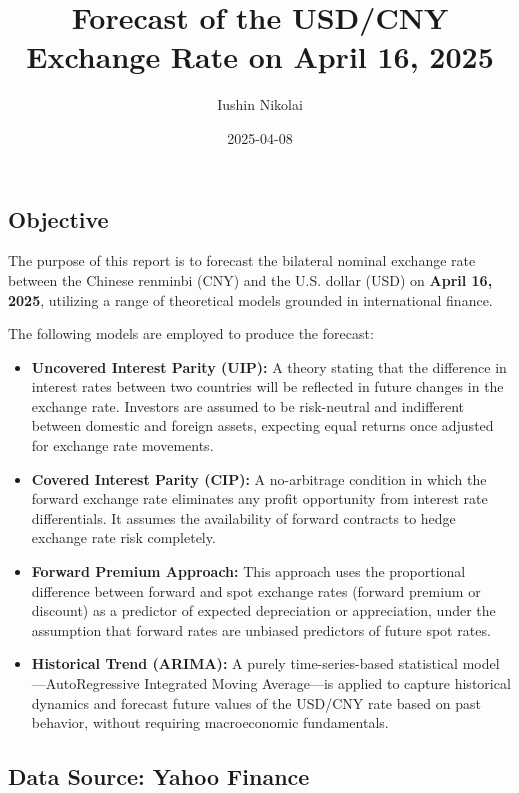 \documentclass[
]{article}
\title{Forecast of the USD/CNY Exchange Rate on April 16, 2025}
\author{Iushin Nikolai}
\date{2025-04-08}
\begin{document}
\maketitle

{
\setcounter{tocdepth}{2}
\tableofcontents
}
\subsection{Objective}\label{objective}

The purpose of this report is to forecast the bilateral nominal exchange
rate between the Chinese renminbi (CNY) and the U.S. dollar (USD) on
\textbf{April 16, 2025}, utilizing a range of theoretical models
grounded in international finance.

The following models are employed to produce the forecast:

\begin{itemize}
\item
  \textbf{Uncovered Interest Parity (UIP):} A theory stating that the
  difference in interest rates between two countries will be reflected
  in future changes in the exchange rate. Investors are assumed to be
  risk-neutral and indifferent between domestic and foreign assets,
  expecting equal returns once adjusted for exchange rate movements.
\item
  \textbf{Covered Interest Parity (CIP):} A no-arbitrage condition in
  which the forward exchange rate eliminates any profit opportunity from
  interest rate differentials. It assumes the availability of forward
  contracts to hedge exchange rate risk completely.
\item
  \textbf{Forward Premium Approach:} This approach uses the proportional
  difference between forward and spot exchange rates (forward premium or
  discount) as a predictor of expected depreciation or appreciation,
  under the assumption that forward rates are unbiased predictors of
  future spot rates.
\item
  \textbf{Historical Trend (ARIMA):} A purely time-series-based
  statistical model---AutoRegressive Integrated Moving Average---is
  applied to capture historical dynamics and forecast future values of
  the USD/CNY rate based on past behavior, without requiring
  macroeconomic fundamentals.
\end{itemize}

\subsection{Data Source: Yahoo Finance}\label{data-source-yahoo-finance}
\end{document}
